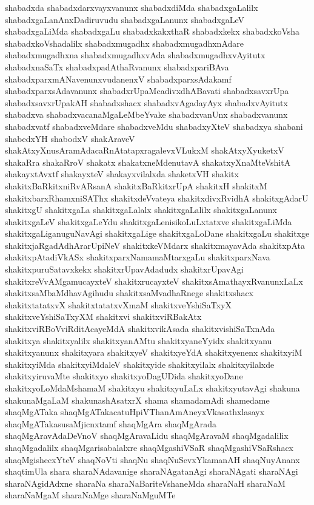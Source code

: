 {shabadxda
shabadxdarxvayxvanunx
shabadxdiMda
shabadxgaLalilx
shabadxgaLanAnxDadiruvudu
shabadxgaLanunx
shabadxgaLeV
shabadxgaLiMda
shabadxgaLu
shabadxkakxthaR
shabadxkekx
shabadxkoVsha
shabadxkoVshadalilx
shabadxmugadhx
shabadxmugadhxnAdare
shabadxmugadhxna
shabadxmugadhxvAda
shabadxmugadhxvAyitutx
shabadxnaSaTx
shabadxpadAthaRvanunx
shabadxpariBAva
shabadxparxmANavenunxvudanenxV
shabadxparxsAdakamf
shabadxparxsAdavanunx
shabadxrUpaMcadivxdhABavati
shabadxsavxrUpa
shabadxsavxrUpakAH
shabadxshacx
shabadxvAgadayAyx
shabadxvAyitutx
shabadxva
shabadxvacanaMgaLeMbeYvake
shabadxvanUnx
shabadxvanunx
shabadxvatf
shabadxveMdare
shabadxveMdu
shabadxyXteV
shabadxya
shabani
shabedxYH
shabodxV
shakAraveV
shakAtxyXnusAramAdacaRnAtatapxragalevxVLukxM
shakAtxyXyuketxV
shakaRra
shakaRroV
shakatx
shakatxneMdenutavA
shakatxyXnaMteVshitA
shakayxtAvxtf
shakayxteV
shakayxvilalxda
shaketxVH
shakitx
shakitxBaRkitxniRvARsanA
shakitxBaRkitxrUpA
shakitxH
shakitxM
shakitxbarxRhamxniSAThx
shakitxdeVvateya
shakitxdivxRvidhA
shakitxgAdarU
shakitxgU
shakitxgaLa
shakitxgaLalalx
shakitxgaLalilx
shakitxgaLanunx
shakitxgaLeV
shakitxgaLeYdu
shakitxgaLenisikoLuLxtatxve
shakitxgaLiMda
shakitxgaLiganuguNavAgi
shakitxgaLige
shakitxgaLoDane
shakitxgaLu
shakitxge
shakitxjaRgadAdhArarUpiNeV
shakitxkeVMdarx
shakitxmayavAda
shakitxpAta
shakitxpAtadiVkASx
shakitxparxNamamaMtarxgaLu
shakitxparxNava
shakitxpuruSatavxkekx
shakitxrUpavAdadudx
shakitxrUpavAgi
shakitxreVvAMgamucayxteV
shakitxrucayxteV
shakitxsAmathayxRvanunxLaLx
shakitxsaMbaMdhavAgihudu
shakitxsaMvadhaRnege
shakitxshacx
shakitxtatatxvX
shakitxtatatxvXmaM
shakitxveYshiSaTxyX
shakitxveYshiSaTxyXM
shakitxvi
shakitxviRBakAtx
shakitxviRBoVviRditAcayeMdA
shakitxvikAsada
shakitxvishiSaTxnAda
shakitxya
shakitxyalilx
shakitxyanAMtu
shakitxyaneYyidx
shakitxyanu
shakitxyanunx
shakitxyara
shakitxyeV
shakitxyeYdA
shakitxyenenx
shakitxyiM
shakitxyiMda
shakitxyiMdaleV
shakitxyide
shakitxyilalx
shakitxyilalxde
shakitxyiruvaMte
shakitxyo
shakitxyoDagUDida
shakitxyoDane
shakitxyoLoMdaMshamaM
shakitxyu
shakitxyuLaLx
shakitxyutavAgi
shakuna
shakunaMgaLaM
shakunashAsatxrX
shama
shamadamAdi
shamedame
shaqMgATaka
shaqMgATakacatuHpiVThanAmAneyxVkasathxlasayx
shaqMgATakasusaMjicnxtamf
shaqMgAra
shaqMgArada
shaqMgAravAdaDeVnoV
shaqMgAravaLidu
shaqMgAravaM
shaqMgadalilix
shaqMgadalilx
shaqMgarisabalalxre
shaqMgashiVSaR
shaqMgashiVSaRshacx
shaqMgishecxYteV
shaqNoVti
shaqNu
shaqNuSevxYkamanAH
shaqNuyAnanx
shaqtimUla
shara
sharaNAdavanige
sharaNAgatanAgi
sharaNAgati
sharaNAgi
sharaNAgidAdxne
sharaNa
sharaNaBariteVshaneMda
sharaNaH
sharaNaM
sharaNaMgaM
sharaNaMge
sharaNaMguMTe
}
